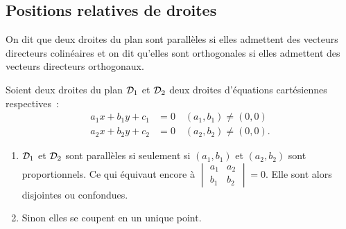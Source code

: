 \subsection{Positions relatives de droites}
On dit que deux droites du plan sont parallèles si elles admettent des vecteurs 
directeurs colinéaires et on dit qu'elles sont orthogonales si elles admettent 
des vecteurs directeurs orthogonaux.

\begin{prop}
    Soient deux droites du plan \(\mathcal{D}_1\) et \(\mathcal{D}_2\) deux droites d'équations 
    cartésiennes respectives~:
    \begin{align}
        a_1x + b_1y + c_1& = 0 \quad (a_1 , b_1)\neq(0 , 0)\\
        a_2x + b_2y + c_2& = 0 \quad (a_2 , b_2)\neq(0 , 0).
    \end{align}

    \begin{enumerate}
        \item \(\mathcal{D}_1\) et \(\mathcal{D}_2\) sont parallèles si seulement si 
            \((a_1 , b_1)\) et \((a_2 , b_2)\) sont proportionnels. Ce qui équivaut 
            encore à \(
            \begin{vmatrix}
                a_1 & a_2 \\
                b_1 & b_2
            \end{vmatrix} = 0\).
            Elle sont alors disjointes ou confondues.
        \item Sinon elles se coupent en un unique point.
    \end{enumerate}
\end{prop}

